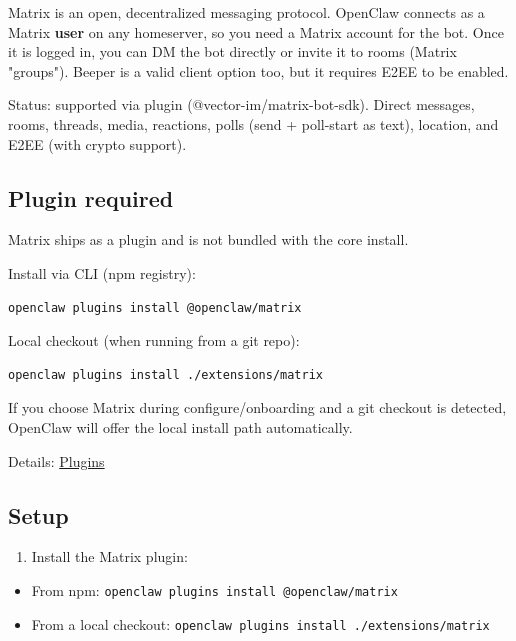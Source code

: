 Matrix is an open, decentralized messaging protocol. OpenClaw connects as a Matrix \textbf{user}
on any homeserver, so you need a Matrix account for the bot. Once it is logged in, you can DM
the bot directly or invite it to rooms (Matrix "groups"). Beeper is a valid client option too,
but it requires E2EE to be enabled.

Status: supported via plugin (@vector-im/matrix-bot-sdk). Direct messages, rooms, threads, media, reactions,
polls (send + poll-start as text), location, and E2EE (with crypto support).

\subsection{Plugin required}


Matrix ships as a plugin and is not bundled with the core install.

Install via CLI (npm registry):

\begin{lstlisting}[language=bash]
openclaw plugins install @openclaw/matrix
\end{lstlisting}


Local checkout (when running from a git repo):

\begin{lstlisting}[language=bash]
openclaw plugins install ./extensions/matrix
\end{lstlisting}


If you choose Matrix during configure/onboarding and a git checkout is detected,
OpenClaw will offer the local install path automatically.

Details: \href{/tools/plugin}{Plugins}

\subsection{Setup}


\begin{enumerate}
  \item Install the Matrix plugin:
\end{enumerate}

\begin{itemize}
  \item From npm: \texttt{openclaw plugins install @openclaw/matrix}
  \item From a local checkout: \texttt{openclaw plugins install ./extensions/matrix}
\end{itemize}


